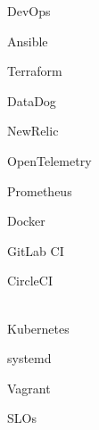 \begin{skillset}{DevOps}
  \item Ansible
  \item Terraform
  \item DataDog
  \item NewRelic
  \item OpenTelemetry
  \item Prometheus
  \item Docker
  \item GitLab CI
  \item CircleCI
  \item \\Kubernetes
  \item systemd
  \item Vagrant
  \item SLOs
\end{skillset}
